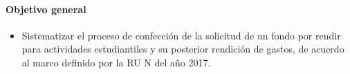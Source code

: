 \paragraph{Objetivo general}
\begin{itemize}
\item Sistematizar el proceso de confección de la solicitud de un fondo por rendir para actividades estudiantiles y su posterior rendición de gastos, de acuerdo al marco definido por la RU N del año 2017.
\end{itemize}
